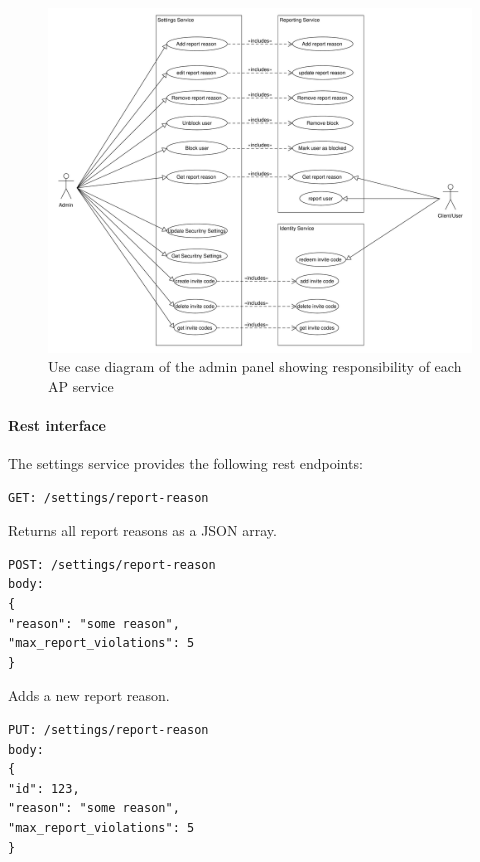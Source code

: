 \begin{figure}[!ht]
    \centering
    \includegraphics[width=1.0\textwidth]{./images/UseCaseDiagramAdminPanel}
    \caption{Use case diagram of the admin panel showing responsibility of each AP service}
    \label{fig:ucd}
\end{figure}

\paragraph{Rest interface}

The settings service provides the following \ac{rest} endpoints:

\begin{lstlisting}[label={lst:lstlisting}]
GET: /settings/report-reason
\end{lstlisting}

Returns all report reasons as a JSON array.

\begin{lstlisting}[label={lst:lstlisting2}]
POST: /settings/report-reason
body:
{
"reason": "some reason",
"max_report_violations": 5
}
\end{lstlisting}

Adds a new report reason.

\begin{lstlisting}[label={lst:lstlisting3}]
PUT: /settings/report-reason
body:
{
"id": 123,
"reason": "some reason",
"max_report_violations": 5
}
\end{lstlisting}

